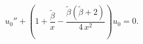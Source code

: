 \begin{equation}
u_0''+\left(1+\frac{\tilde{\beta}}{x}-\frac{\tilde{\beta}(\tilde{\beta}+2)}{4\,x^2}\right)u_0=0.
\label{u0}
\end{equation}

